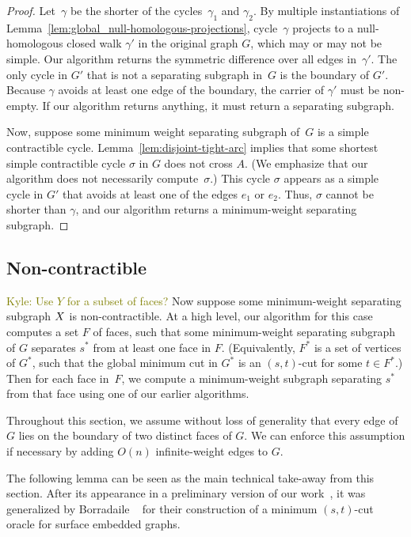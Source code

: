 \documentclass[letterpaper,review]{siamart190516}
\def\subsnip{\mathbin{\raisebox{0.15ex}{\rotatebox[origin=c]{60}{\footnotesize\Rightscissors}\!}}}
\def\Gsnip{\mathord{G_{\subsnip}}}
\def\Gsnip{G'}
\def\knote#1{\textcolor{olive}{Kyle: #1}}
\begin{document}
{\begin{proof}
Let~$\gamma$ be the shorter of the cycles~$\gamma_1$ and $\gamma_2$.  By multiple instantiations of Lemma~\ref{lem:global_null-homologous-projections}, cycle~$\gamma$ projects to a null-homologous closed walk $\gamma'$ in the original graph $G$, which may or may not be simple.
Our algorithm returns the symmetric difference over all edges in~$\gamma'$.
The only cycle in $\Gsnip$ that is not a separating subgraph in~$G$ is the boundary of $\Gsnip$.
Because $\gamma$ avoids at least one edge of the boundary, the carrier of $\gamma'$ must be non-empty. If our algorithm returns anything, it must return a separating subgraph.

Now, suppose some minimum weight separating subgraph of~$G$ is a simple contractible cycle.
Lemma~\ref{lem:disjoint-tight-arc} implies that some shortest simple contractible cycle $\sigma$ in
$G$ does not cross $A$.  (We emphasize that our algorithm does not necessarily compute~$\sigma$.)  This cycle $\sigma$ appears as a simple cycle in $\Gsnip$ that avoids at least one of the edges $e_1$ or $e_2$.  Thus, $\sigma$ cannot be shorter than $\gamma$, and our algorithm returns a minimum-weight separating subgraph.
\end{proof}


\subsection{Non-contractible}
\label{sec:global_non-contractible}

\knote{Use \(Y\) for a subset of faces?}
Now suppose some minimum-weight separating subgraph $X$ is non-contractible.  At a high level,
our algorithm for this case computes a set $F$ of faces, such that some minimum-weight separating
subgraph of $G$ separates $s^*$ from at least one face in $F$.  (Equivalently, $F^*$ is a set of
vertices of $G^*$, such that the global minimum cut in $G^*$ is an $(s,t)$-cut for some $t\in
F^*$.)  Then for each face in~$F$, we compute a minimum-weight subgraph separating $s^*$ from that
face using one of our earlier algorithms.

Throughout this section, we assume without loss of generality that every edge of $G$ lies on the boundary of two distinct faces of $G$.  We can enforce this assumption if necessary by adding $O(n)$ infinite-weight edges to $G$.

The following lemma can be seen as the main technical take-away from this section.
After its appearance in a preliminary version of our work~\cite{efn-gmcse-12}, it was
generalized by Borradaile \etal~\cite{benw-amcnt-16} for their construction of a minimum $(s,t)$-cut
oracle for surface embedded graphs.

}
\end{document}
